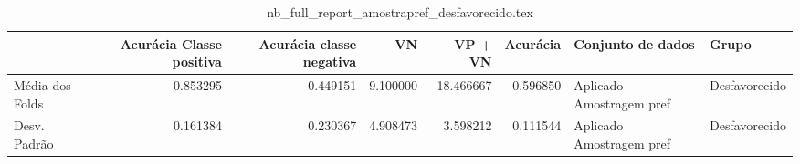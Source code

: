\begin{table}
\centering
\caption{nb_full_report_amostrapref_desfavorecido.tex}
\label{nb_full_report_amostrapref_desfavorecido.tex}
\begin{tabular}{lrrrrrll}
\toprule
{} &  Acurácia Classe positiva &  Acurácia classe negativa &       VN  &   VP + VN  &  Acurácia &         Conjunto de dados &          Grupo \\
\midrule
Média dos Folds &                  0.853295 &                  0.449151 &  9.100000 &  18.466667 &  0.596850 &  Aplicado Amostragem pref &  Desfavorecido \\
Desv. Padrão    &                  0.161384 &                  0.230367 &  4.908473 &   3.598212 &  0.111544 &  Aplicado Amostragem pref &  Desfavorecido \\
\bottomrule
\end{tabular}
\end{table}
